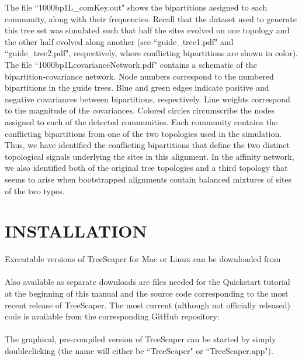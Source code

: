\documentclass[11pt]{article}
\begin{document}
The file ``1000bp1L\_comKey.out" shows the bipartitions assigned to each community,
along with their frequencies. Recall that the dataset used to generate this tree set was
simulated such that half the sites evolved on one topology and the other half evolved along
another (see ``guide\_tree1.pdf" and ``guide\_tree2.pdf", respectively, where conflicting
bipartitions are shown in color). The file ``1000bp1LcovarianceNetwork.pdf" contains a
schematic of the bipartition-covariance network. Node numbers correspond to the numbered
bipartitions in the guide trees. Blue and green edges indicate positive and negative
covariances between bipartitions, respectively. Line weights correspond to the magnitude of
the covariances. Colored circles circumscribe the nodes assigned to each of the detected
communities. Each community contains the conflicting bipartitions from one of the two
topologies used in the simulation. Thus, we have identified the conflicting bipartitions that
define the two distinct topological signals underlying the sites in this alignment. In the
affinity network, we also identified both of the original tree topologies and a third topology
that seems to arise when bootstrapped alignments contain balanced mixtures of sites of the
two types. \\


\newpage
\section{INSTALLATION}\label{sect:Installation}

Executable versions of TreeScaper for Mac or Linux can be downloaded from \\

 \\


Also available as separate downloads are files needed for the Quickstart tutorial at the
beginning of this manual and the source code corresponding to the most recent release of
TreeScaper. The most current (although not officially released) code is available from the
corresponding GitHub repository: \\

\\


The graphical, pre-compiled version of TreeScaper can be started by simply doubleclicking (the name will either be ``TreeScaper" or ``TreeScaper.app").\\
\end{document}
